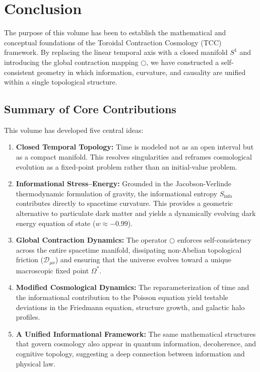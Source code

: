 \documentclass[12pt,openany]{book}
\newcommand{\SingOp}{\bigcirc}
\newcommand{\Sinfo}{S_{\text{info}}}
\theoremstyle{plain}
\theoremstyle{definition}
\theoremstyle{remark}
\begin{document}
\chapter{Conclusion}

The purpose of this volume has been to establish the mathematical and 
conceptual foundations of the Toroidal Contraction Cosmology (TCC) 
framework. By replacing the linear temporal axis with a closed manifold 
$S^1$ and introducing the global contraction mapping $\SingOp$, we have 
constructed a self-consistent geometry in which information, curvature, and 
causality are unified within a single topological structure.

\section{Summary of Core Contributions}

This volume has developed five central ideas:

\begin{enumerate}
    \item \textbf{Closed Temporal Topology:}  
    Time is modeled not as an open interval but as a compact manifold.  
    This resolves singularities and reframes cosmological evolution as a 
    fixed-point problem rather than an initial-value problem.

    \item \textbf{Informational Stress--Energy:}  
    Grounded in the Jacobson-Verlinde thermodynamic formulation of gravity, the informational entropy $\Sinfo$ contributes directly to spacetime curvature. This provides a geometric alternative to particulate dark matter and yields a dynamically evolving dark energy equation of state ($w \approx -0.99$).

    \item \textbf{Global Contraction Dynamics:}  
    The operator $\SingOp$ enforces self-consistency across the entire 
    spacetime manifold, dissipating non-Abelian topological friction ($\mathcal{D}_{\mu\nu}$) and ensuring that the universe evolves toward a unique macroscopic fixed point $\Omega^*$.

    \item \textbf{Modified Cosmological Dynamics:}  
    The reparameterization of time and the informational contribution to the 
    Poisson equation yield testable deviations in the Friedmann equation, 
    structure growth, and galactic halo profiles.

    \item \textbf{A Unified Informational Framework:}  
    The same mathematical structures that govern cosmology also appear in 
    quantum information, decoherence, and cognitive topology, suggesting a 
    deep connection between information and physical law.
\end{enumerate}
\end{document}
